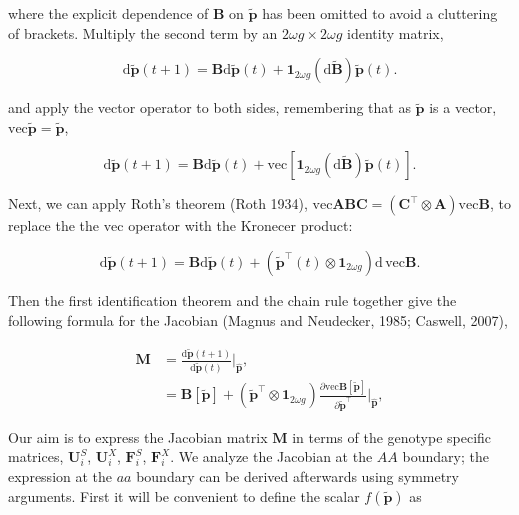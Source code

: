 \documentclass[11pt]{article}
\def\mbf#1{\mathbf{#1}}
\begin{document}
\noindent where the explicit dependence of $\mbf{B}$ on $\tilde{\mbf{p}}$ has been omitted to avoid a cluttering of brackets. Multiply the second term by an $2 \omega g \times 2 \omega g$ identity matrix,

\begin{equation} 
	\text{d} \tilde{\mbf{p}}(t + 1) = \mbf{B}\text{d} \tilde{\mbf{p}}(t) + \mbf{1}_{2 \omega g} \left(\text{d} \tilde{\mbf{B}} \right) \tilde{\mbf{p}}(t).
\end{equation}

\noindent and apply the vector operator to both sides, remembering that as $\tilde{\mbf{p}}$ is a vector, $\text{vec}\tilde{\mbf{p}} = \tilde{\mbf{p}}$,

\begin{equation} 
	\text{d} \tilde{\mbf{p}}(t + 1) = \mbf{B}\text{d} \tilde{\mbf{p}}(t) + \text{vec} \left[ \mbf{1}_{2 \omega g} \left(\text{d} \tilde{\mbf{B}} \right) \tilde{\mbf{p}}(t) \right].
\end{equation}

\noindent Next, we can apply Roth's theorem (Roth 1934), $\text{vec}\mbf{ABC} = \left( \mbf{C}^{\intercal} \otimes \mbf{A} \right) \text{vec}\mbf{B}$, to replace the the $\text{vec}$ operator with the Kronecer product:

\begin{equation} 
	\text{d} \tilde{\mbf{p}}(t + 1) = \mbf{B}\text{d} \tilde{\mbf{p}}(t) + \left( \tilde{\mbf{p}}^{\intercal}(t) \otimes \mbf{1}_{2 \omega g} \right) \text{d}\,\text{vec}\mbf{B}.
\end{equation}

\noindent Then the first identification theorem and the chain rule together give the following formula for the Jacobian (Magnus and Neudecker, 1985; Caswell, 2007),

\begin{align*} \label{eq:genJacobian}
	\mbf{M} &=  \frac{ \text{d} \tilde{\mbf{p}}(t + 1) }{ \text{d} \tilde{\mbf{p}}(t) } \bigg\rvert_{\hat{\mbf{p}}}, \\
			&= \mbf{B}[\tilde{\mbf{p}}] + \left( \tilde{\mbf{p}}^{\intercal} \otimes \mbf{1}_{2 \omega g} \right) \frac{ \partial \text{vec}{\mbf{B}[\tilde{\mbf{p}}]} }{ \partial \tilde{\mbf{p}}^{\intercal} } \bigg\rvert_{\hat{\mbf{p}}},
\end{align*}

Our aim is to express the Jacobian matrix $\mbf{M}$ in terms of the genotype specific matrices, $\mbf{U}^S_i$, $\mbf{U}^X_i$, $\mbf{F}^S_i$, $\mbf{F}^X_i$. We analyze the Jacobian at the $AA$ boundary; the expression at the $aa$ boundary can be derived afterwards using symmetry arguments. First it will be convenient to define the scalar $f(\tilde{\mbf{p}})$ as
\end{document}
